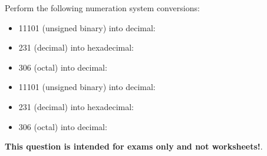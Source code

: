 

Perform the following numeration system conversions:

\begin{itemize}
\item{} 11101 (unsigned binary) into decimal: \underbar{\hskip 50pt}
\vskip 10pt
\item{} 231 (decimal) into hexadecimal: \underbar{\hskip 50pt}
\vskip 10pt
\item{} 306 (octal) into decimal: \underbar{\hskip 50pt}
\end{itemize}







\begin{itemize}
\item{} 11101 (unsigned binary) into decimal: 
\vskip 10pt
\item{} 231 (decimal) into hexadecimal: 
\vskip 10pt
\item{} 306 (octal) into decimal: 
\end{itemize}







{\bf This question is intended for exams only and not worksheets!}.


